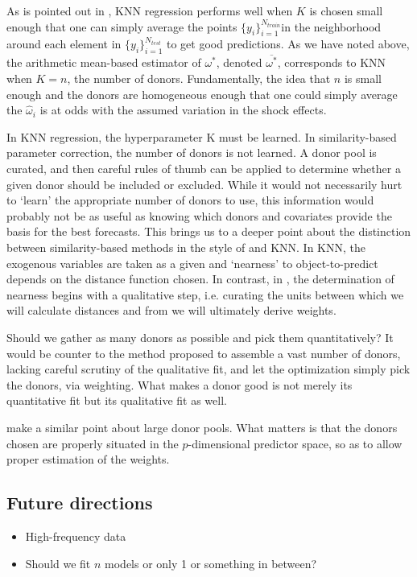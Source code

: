 \documentclass[11pt,3p,review,authoryear]{elsarticle}
\theoremstyle{definition}
\begin{document}
As is pointed out in \citet{hastie2009elements}, KNN regression performs well when $K$ is chosen small enough that one can simply average the points $\{y_{i}\}_{i=1}^{N_{train}}$in the neighborhood around each element in $\{y_{i}\}_{i=1}^{N_{test}}$ to get good predictions.  As we have noted above, the arithmetic mean-based estimator of $\omega^{*}$, denoted $\overline{\omega^{*}}$, corresponds to KNN when $K = n$, the number of donors.  Fundamentally, the idea that $n$ is small enough and the donors are homogeneous enough that one could simply average the $\hat\omega_{i}$ is at odds with the assumed variation in the shock effects.

In KNN regression, the hyperparameter K must be learned.  In similarity-based parameter correction, the number of donors is not learned.  A donor pool is curated, and then careful rules of thumb can be applied to determine whether a given donor should be included or excluded.  While it would not necessarily hurt to `learn' the appropriate number of donors to use, this information would probably not be as useful as knowing which donors and covariates provide the basis for the best forecasts.  This brings us to a deeper point about the distinction between similarity-based methods in the style of \citet{lin2021minimizing} and KNN.  In KNN, the exogenous variables are taken as a given and `nearness' to object-to-predict depends on the distance function chosen.  In contrast, in \citet{lin2021minimizing}, the determination of nearness begins with a qualitative step, i.e. curating the units between which we will calculate distances and from we will ultimately derive weights.

Should we gather as many donors as possible and pick them quantitatively?  It would be counter to the method proposed to assemble a vast number of donors, lacking careful scrutiny of the qualitative fit, and let the optimization simply pick the donors, via weighting.  What makes a donor good is not merely its quantitative fit but its qualitative fit as well.

\citet{abadie2022synthetic} make a similar point about large donor pools.  What matters is that the donors chosen are properly situated in the $p$-dimensional predictor space, so as to allow proper estimation of the weights.


\subsection{Future directions}
\begin{itemize}
  \item High-frequency data
  \item Should we fit $n$ models or only 1 or something in between?
\end{itemize}
\end{document}
